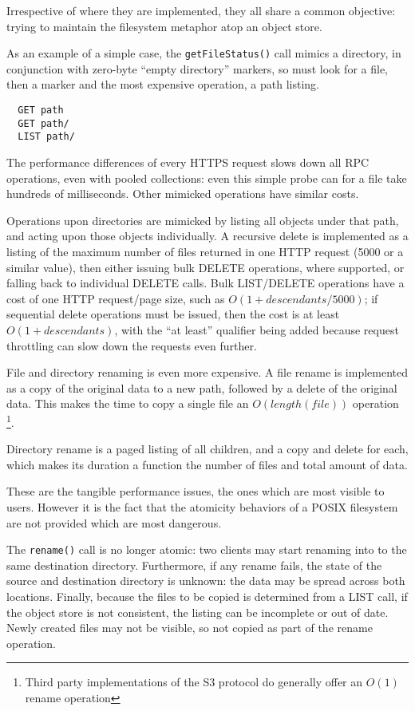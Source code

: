 Irrespective of where they are implemented, they all share a common objective:
trying to maintain the filesystem metaphor atop an object store.

As an example of a simple case, the \texttt{getFileStatus()} call mimics
a directory, in conjunction with zero-byte ``empty directory'' markers,
so must look for a file, then a marker and the most expensive operation, a path listing.

\begin{verbatim}
  GET path
  GET path/
  LIST path/
\end{verbatim}

The performance differences of every HTTPS request slows
down all RPC operations, even with pooled collections: even this simple probe
can for a file take hundreds of milliseconds.
Other mimicked operations have similar costs.

Operations upon directories are mimicked by listing all objects under that path,
and acting upon those objects individually.
A recursive delete is implemented as a listing of the maximum number of files
returned in one HTTP request (5000 or a similar value), then either issuing
bulk DELETE operations, where supported, or falling back to individual DELETE
calls.
Bulk LIST/DELETE operations have a cost of one HTTP request/page size, such
as $O(1 + descendants/5000)$; if sequential delete operations must be issued, then
the cost is at least $O(1+ descendants)$, with the ``at least'' qualifier being
added because request throttling can slow down the requests even further.

File and directory renaming is even more expensive.
A file rename is implemented as a copy of the original data to a new path,
followed by a delete of the original data.
This makes the time to copy a single file an $O(length(file))$ operation
\footnote{Third party implementations of the S3 protocol do generally offer an $O(1)$ rename operation}.

Directory rename is a paged listing of all children, and a copy and delete for
each, which makes its duration a function the number of files and total amount of data.

These are the tangible performance issues, the ones which are most visible
to users.
However it is the fact that the atomicity behaviors of a POSIX filesystem
are not provided which are most dangerous.

The \texttt{rename()} call is no longer atomic: two clients may start renaming
into to the same destination directory.
Furthermore, if any rename fails, the state of the source and destination
directory is unknown: the data may be spread across both locations.
Finally, because the files to be copied is determined from a LIST call,
if the object store is not consistent, the listing can be incomplete or out of
date.
Newly created files may not be visible, so not copied as part of the rename
operation.

